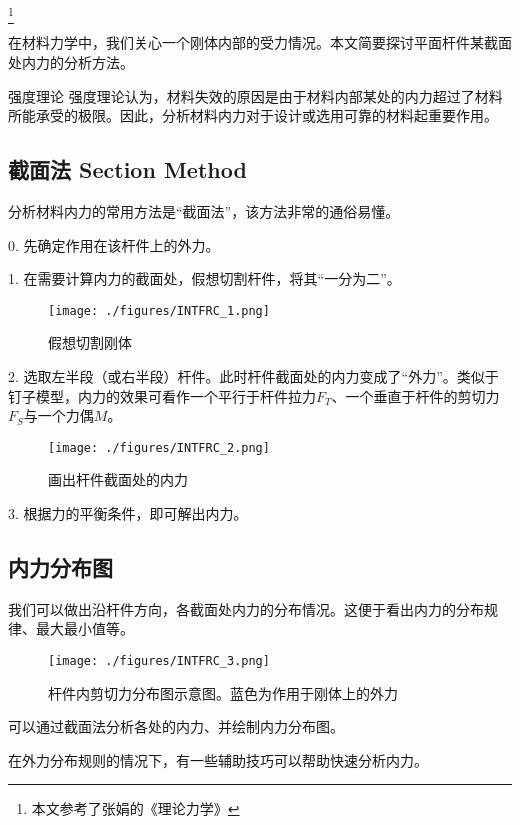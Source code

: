 
\footnote{本文参考了张娟的《理论力学》}

在材料力学中，我们关心一个刚体内部的受力情况。本文简要探讨平面杆件某截面处内力的分析方法。

\begin{example}{强度理论}
强度理论认为，材料失效的原因是由于材料内部某处的内力超过了材料所能承受的极限。因此，分析材料内力对于设计或选用可靠的材料起重要作用。
\end{example}

\subsection{截面法 Section Method}
分析材料内力的常用方法是“截面法”，该方法非常的通俗易懂。

0. 先确定作用在该杆件上的外力。

1. 在需要计算内力的截面处，假想切割杆件，将其“一分为二”。
\begin{figure}[ht]
\centering
\texttt{[image: ./figures/INTFRC\_1.png]}
\caption{假想切割刚体} \label{INTFRC_fig1}
\end{figure}

2. 选取左半段（或右半段）杆件。此时杆件截面处的内力变成了“外力”。类似于钉子模型，内力的效果可看作一个平行于杆件拉力$F_T$、一个垂直于杆件的剪切力$F_S$与一个力偶$M$。
\begin{figure}[ht]
\centering
\texttt{[image: ./figures/INTFRC\_2.png]}
\caption{画出杆件截面处的内力} \label{INTFRC_fig2}
\end{figure}

3. 根据力的平衡条件，即可解出内力。

\subsection{内力分布图}
我们可以做出沿杆件方向，各截面处内力的分布情况。这便于看出内力的分布规律、最大最小值等。
\begin{figure}[ht]
\centering
\texttt{[image: ./figures/INTFRC\_3.png]}
\caption{杆件内剪切力分布图示意图。蓝色为作用于刚体上的外力} \label{INTFRC_fig3}
\end{figure}

可以通过截面法分析各处的内力、并绘制内力分布图。

在外力分布规则的情况下，有一些辅助技巧可以帮助快速分析内力。

